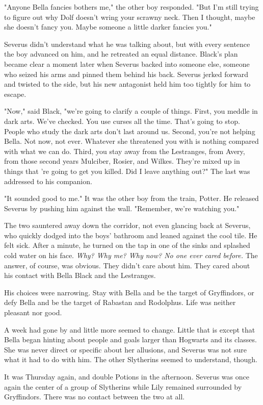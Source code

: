 "Anyone Bella fancies bothers me," the other boy responded. "But I'm still trying to figure out why Dolf doesn't wring your scrawny neck. Then I thought, maybe she doesn't fancy you. Maybe someone a little darker fancies you."

Severus didn't understand what he was talking about, but with every sentence the boy advanced on him, and he retreated an equal distance. Black's plan became clear a moment later when Severus backed into someone else, someone who seized his arms and pinned them behind his back. Severus jerked forward and twisted to the side, but his new antagonist held him too tightly for him to escape.

"Now," said Black, "we're going to clarify a couple of things. First, you meddle in dark arts. We've checked. You use curses all the time. That's going to stop. People who study the dark arts don't last around us. Second, you're not helping Bella. Not now, not ever. Whatever she threatened you with is nothing compared with what we can do. Third, you stay away from the Lestranges, from Avery, from those second years Mulciber, Rosier, and Wilkes. They're mixed up in things that 're going to get you killed. Did I leave anything out?" The last was addressed to his companion.

"It sounded good to me." It was the other boy from the train, Potter. He released Severus by pushing him against the wall. "Remember, we're watching you."

The two sauntered away down the corridor, not even glancing back at Severus, who quickly dodged into the boys' bathroom and leaned against the cool tile. He felt sick. After a minute, he turned on the tap in one of the sinks and splashed cold water on his face. \emph{Why? Why me? Why now? No one ever cared before.} The answer, of course, was obvious. They didn't care about him. They cared about his contact with Bella Black and the Lestranges.

His choices were narrowing. Stay with Bella and be the target of Gryffindors, or defy Bella and be the target of Rabastan and Rodolphus. Life was neither pleasant nor good.

A week had gone by and little more seemed to change. Little that is except that Bella began hinting about people and goals larger than Hogwarts and its classes. She was never direct or specific about her allusions, and Severus was not sure what it had to do with him. The other Slytherins seemed to understand, though.

It was Thursday again, and double Potions in the afternoon. Severus was once again the center of a group of Slytherins while Lily remained surrounded by Gryffindors. There was no contact between the two at all.

